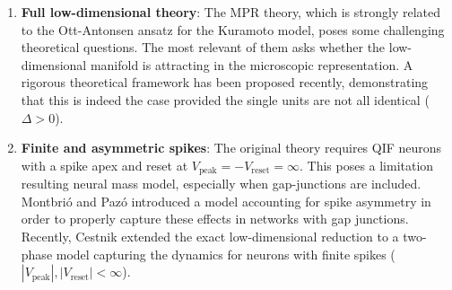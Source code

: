 \documentclass[12pt]{article}
\numberwithin{equation}{section}
\newcommand{\rev}[1]{\begingroup\color{blue}#1\endgroup}
\begin{document}
\begin{enumerate}
    \item \textbf{Full low-dimensional theory}: The MPR theory, which is strongly related to the Ott-Antonsen ansatz for the Kuramoto model\cite{Ott2008}, poses some challenging theoretical questions. The most relevant of them asks whether the low-dimensional manifold is attracting in the microscopic representation. A rigorous theoretical framework has been proposed recently, demonstrating that this is indeed the case provided the single units are not all identical ($\Delta>0$)\cite{Pietras2023}. 
    \rev{\item \textbf{Finite and asymmetric spikes}: The original theory requires QIF neurons with a 
    spike apex and reset at $V_\text{peak}=-V_\text{reset} = \infty$. This poses a limitation resulting neural mass model,
    especially when gap-junctions are included. Montbrió and Pazó \cite{montbrio2020} introduced a model accounting for spike asymmetry
     in order to properly capture these effects in networks with gap junctions. Recently, Cestnik \cite{cestnik2026} extended the exact low-dimensional reduction to a two-phase model capturing the dynamics for neurons with finite spikes ($|V_\text{peak}|,|V_\text{reset}| < \infty$).}
\end{enumerate}

\end{document}
